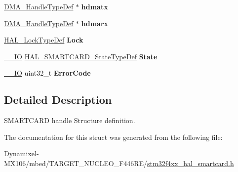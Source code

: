 \begin{DoxyCompactItemize}
\item 
\hyperlink{group___d_m_a___exported___types_ga41b754a906b86bce54dc79938970138b}{D\+M\+A\+\_\+\+Handle\+Type\+Def} $\ast$ {\bfseries hdmatx}\hypertarget{struct_s_m_a_r_t_c_a_r_d___handle_type_def_ae3fec6fd1eae5624682c646448e018ce}{}\label{struct_s_m_a_r_t_c_a_r_d___handle_type_def_ae3fec6fd1eae5624682c646448e018ce}

\item 
\hyperlink{group___d_m_a___exported___types_ga41b754a906b86bce54dc79938970138b}{D\+M\+A\+\_\+\+Handle\+Type\+Def} $\ast$ {\bfseries hdmarx}\hypertarget{struct_s_m_a_r_t_c_a_r_d___handle_type_def_afb70bd7a1b23c58a20b9af41bc9483b1}{}\label{struct_s_m_a_r_t_c_a_r_d___handle_type_def_afb70bd7a1b23c58a20b9af41bc9483b1}

\item 
\hyperlink{stm32f4xx__hal__def_8h_ab367482e943333a1299294eadaad284b}{H\+A\+L\+\_\+\+Lock\+Type\+Def} {\bfseries Lock}\hypertarget{struct_s_m_a_r_t_c_a_r_d___handle_type_def_aef5a4eb8f0754c9e640ad780c85f89c6}{}\label{struct_s_m_a_r_t_c_a_r_d___handle_type_def_aef5a4eb8f0754c9e640ad780c85f89c6}

\item 
\hyperlink{core__sc300_8h_aec43007d9998a0a0e01faede4133d6be}{\+\_\+\+\_\+\+IO} \hyperlink{group___s_m_a_r_t_c_a_r_d___exported___types_ga79d6a3b95636861dcfd70913746e087e}{H\+A\+L\+\_\+\+S\+M\+A\+R\+T\+C\+A\+R\+D\+\_\+\+State\+Type\+Def} {\bfseries State}\hypertarget{struct_s_m_a_r_t_c_a_r_d___handle_type_def_a1e4236925a5326bedce6784a35d98ed7}{}\label{struct_s_m_a_r_t_c_a_r_d___handle_type_def_a1e4236925a5326bedce6784a35d98ed7}

\item 
\hyperlink{core__sc300_8h_aec43007d9998a0a0e01faede4133d6be}{\+\_\+\+\_\+\+IO} uint32\+\_\+t {\bfseries Error\+Code}\hypertarget{struct_s_m_a_r_t_c_a_r_d___handle_type_def_a737200623177867041ccefcc2582bc9d}{}\label{struct_s_m_a_r_t_c_a_r_d___handle_type_def_a737200623177867041ccefcc2582bc9d}

\end{DoxyCompactItemize}


\subsection{Detailed Description}
S\+M\+A\+R\+T\+C\+A\+RD handle Structure definition. 

The documentation for this struct was generated from the following file\+:\begin{DoxyCompactItemize}
\item 
Dynamixel-\/\+M\+X106/mbed/\+T\+A\+R\+G\+E\+T\+\_\+\+N\+U\+C\+L\+E\+O\+\_\+\+F446\+R\+E/\hyperlink{stm32f4xx__hal__smartcard_8h}{stm32f4xx\+\_\+hal\+\_\+smartcard.\+h}\end{DoxyCompactItemize}

